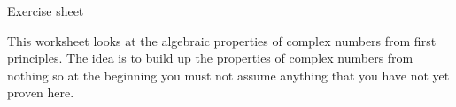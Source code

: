 \documentclass[10pt]{article}
\begin{document}

{\centering

Exercise sheet\\
\vspace{1in}
}

This worksheet looks at the algebraic properties of complex numbers from first
principles. The idea is to build up the properties of complex numbers from
nothing so at the beginning you must not assume anything that you have not yet
proven here.

\hideanswers
\begin{enumerate}
    \foreachproblem[questions]{\item\label{prob:\thisproblemlabel}\thisproblem\vspace{.5in}}
\end{enumerate}
\end{document}
